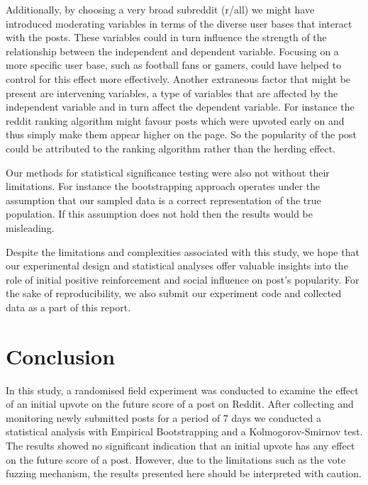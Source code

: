 \documentclass[fleqn,12pt]{article}
\begin{document}
Additionally, by choosing a very broad subreddit (r/all) we might have introduced 
moderating variables in terms of the diverse user bases that interact with the posts. 
These variables
could in turn influence the strength of the relationship between the independent
and dependent variable. Focusing on a more specific user base, such as
football fans or gamers, could have helped to control for this effect more effectively.
Another extraneous factor that might be present are intervening variables, a type of variables that are affected by the independent
variable and in turn affect the dependent variable.
For instance the reddit ranking algorithm might favour posts which were upvoted early on
and thus simply make them appear higher on the page. So the popularity of the post
could be attributed to the ranking algorithm rather than the herding effect. 



Our methods for statistical significance testing were also not without their limitations.
For instance the bootstrapping approach operates under the assumption that our sampled data 
is a correct representation of the true population. If this assumption does not hold
then the results would be misleading.

Despite the limitations and complexities associated with this 
study, we hope that our experimental design and statistical 
analyses offer valuable insights into the role of initial positive reinforcement and social 
influence on post's popularity. For the sake of reproducibility, we also submit 
our experiment code and collected data as a part of this report.


\section{Conclusion}

In this study, a randomised field experiment was conducted to examine the effect of an 
initial upvote on the future score of a post on Reddit. After collecting and monitoring newly submitted posts
for a period of 7 days we conducted a statistical analysis with Empirical Bootstrapping and a Kolmogorov-Smirnov test.
The results showed no significant indication that an initial upvote has any effect on the future score of a post.
However, due to the limitations such as the vote fuzzing mechanism, the results presented here should be interpreted with caution.



 \newpage 


\end{document}
